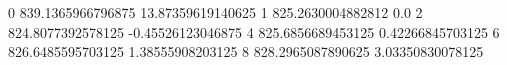 0 839.1365966796875 13.87359619140625
1 825.2630004882812 0.0
2 824.8077392578125 -0.45526123046875
4 825.6856689453125 0.42266845703125
6 826.6485595703125 1.38555908203125
8 828.2965087890625 3.03350830078125
